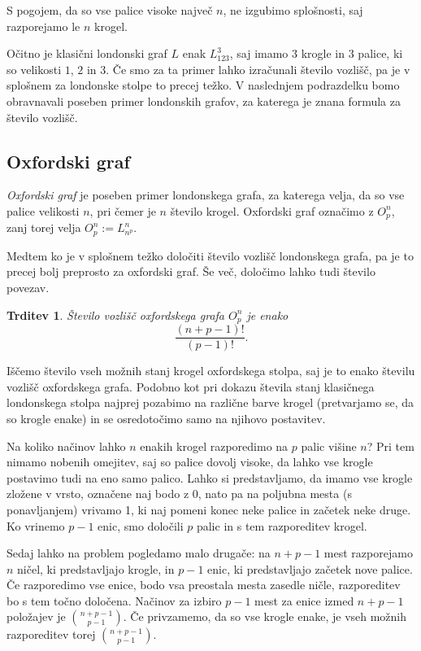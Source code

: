 \documentclass[12pt,a4paper]{amsart}
\theoremstyle{definition} %
\theoremstyle{plain} %
\newtheorem{trditev}[definicija]{Trditev}
\begin{document}
S pogojem, da so vse palice visoke največ $n$, ne izgubimo splošnosti, saj razporejamo le $n$ krogel.

Očitno je klasični londonski graf $L$ enak $L_{123}^3$, saj imamo $3$ krogle in $3$ palice, ki so velikosti $1$, $2$ in $3$.
Če smo za ta primer lahko izračunali število vozlišč, pa je v splošnem za londonske stolpe to precej težko. V naslednjem podrazdelku bomo obravnavali poseben primer londonskih grafov, za katerega je znana formula za število vozlišč. 

\subsection{Oxfordski graf}

\emph{Oxfordski graf} je poseben primer londonskega grafa, za katerega velja, da so vse palice velikosti $n$, pri čemer je $n$ število krogel. Oxfordski graf označimo z $O^n_p$, zanj torej velja $O^n_p := L^n_{n^p}$.

Medtem ko je v splošnem težko določiti število vozlišč londonskega grafa, pa je to precej bolj preprosto za oxfordski graf. Še več, določimo lahko tudi število povezav.

\begin{trditev}
    Število vozlišč oxfordskega grafa $O^n_p$ je enako 
    \begin{equation}
        \label{eq:oxford-vozl}
        \frac{(n+p-1)!}{(p-1)!}.
    \end{equation}

\end{trditev}

\proof
    Iščemo število vseh možnih stanj krogel oxfordskega stolpa, saj je to enako številu vozlišč oxfordskega grafa.
    Podobno kot pri dokazu števila stanj klasičnega londonskega stolpa najprej pozabimo na različne barve krogel (pretvarjamo se, da so krogle enake) in se osredotočimo samo na njihovo postavitev. 
    
    Na koliko načinov lahko $n$ enakih krogel razporedimo na $p$ palic višine $n$? Pri tem nimamo nobenih omejitev, saj so palice dovolj visoke, da lahko vse krogle postavimo tudi na eno samo palico. Lahko si predstavljamo, da imamo vse krogle zložene v vrsto, označene naj bodo z 0, nato pa na poljubna mesta (s ponavljanjem) vrivamo 1, ki naj pomeni konec neke palice in začetek neke druge. Ko vrinemo $p-1$ enic, smo določili $p$ palic in s tem razporeditev krogel. 
    
    Sedaj lahko na problem pogledamo malo drugače: na $n+p-1$ mest razporejamo $n$ ničel, ki predstavljajo krogle, in $p-1$ enic, ki predstavljajo začetek nove palice. Če razporedimo vse enice, bodo vsa preostala mesta zasedle ničle, razporeditev bo s tem točno določena. Načinov za izbiro $p-1$ mest za enice izmed $n+p-1$ položajev je ${n+p-1 \choose p-1}$. Če privzamemo, da so vse krogle enake, je vseh možnih razporeditev torej ${n+p-1 \choose p-1}$.
    
\end{document}

